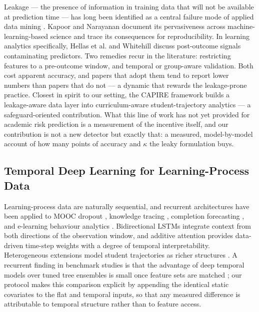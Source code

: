 \documentclass[sn-mathphys,Numbered]{sn-jnl}
\begin{document}
Leakage --- the presence of information in training data that will not be available at prediction time --- has long been identified as a central failure mode of applied data mining \cite{Kaufman2012}. Kapoor and Narayanan \cite{Kapoor2023} document its pervasiveness across machine-learning-based science and trace its consequences for reproducibility. In learning analytics specifically, Hellas et al. \cite{Hellas2018} and Whitehill \cite{Whitehill2015} discuss post-outcome signals contaminating predictors. Two remedies recur in the literature: restricting features to a pre-outcome window, and temporal or group-aware validation. Both cost apparent accuracy, and papers that adopt them tend to report lower numbers than papers that do not --- a dynamic that rewards the leakage-prone practice. Closest in spirit to our setting, the CAPIRE framework \cite{Paz2025} builds a leakage-aware data layer into curriculum-aware student-trajectory analytics --- a safeguard-oriented contribution. What this line of work has not yet provided for academic risk prediction is a measurement of the incentive itself, and our contribution is not a new detector but exactly that: a measured, model-by-model account of how many points of accuracy and $\kappa$ the leaky formulation buys.

\subsection{Temporal Deep Learning for Learning-Process Data}\label{sec:rw_temporal}

Learning-process data are naturally sequential, and recurrent architectures have been applied to MOOC dropout \cite{Fei2015}, knowledge tracing \cite{Piech2015}, completion forecasting \cite{Wang2021}, and e-learning behaviour analytics \cite{Qiu2022}. Bidirectional LSTMs \cite{Graves2005,Hochreiter1997} integrate context from both directions of the observation window, and additive attention \cite{Bahdanau2015,Vaswani2017} provides data-driven time-step weights with a degree of temporal interpretability. Heterogeneous extensions model student trajectories as richer structures \cite{Cheng2024}. A recurrent finding in benchmark studies is that the advantage of deep temporal models over tuned tree ensembles is small once feature sets are matched \cite{Waheed2024,Yin2024}; our protocol makes this comparison explicit by appending the identical static covariates to the flat and temporal inputs, so that any measured difference is attributable to temporal structure rather than to feature access.
\end{document}
